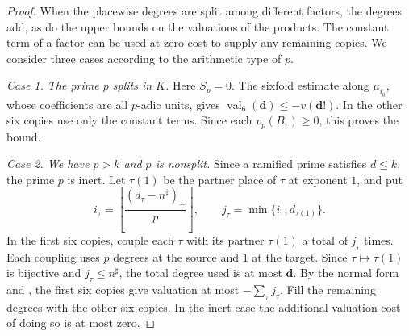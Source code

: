\begin{proof}
When the placewise degrees are split among different factors, the degrees add, as do the upper bounds on the valuations of the products. The constant term of a factor can be used at zero cost to supply any remaining copies. We consider three cases according to the arithmetic type of $p$.

\emph{Case 1. The prime $p$ splits in $K$.} Here $S_p=0$. The sixfold estimate along $\mu_{i_0}$, whose coefficients are all $p$-adic units, gives $\operatorname{val}_6(\boldsymbol d)\le-v(\boldsymbol d!)$. In the other six copies use only the constant terms. Since each $v_p(B_\tau)\ge0$, this proves the bound.

\emph{Case 2. We have $p>k$ and $p$ is nonsplit.} Since a ramified prime satisfies $d\le k$, the prime $p$ is inert. Let $\tau(1)$ be the partner place of $\tau$ at exponent $1$, and put
\[
 i_\tau=\left\lfloor\frac{(d_\tau-n^\sharp)_+}{p}\right\rfloor,
 \qquad j_\tau=\min\{i_\tau,d_{\tau(1)}\}.
\]
In the first six copies, couple each $\tau$ with its partner $\tau(1)$ a total of $j_\tau$ times. Each coupling uses $p$ degrees at the source and $1$ at the target. Since $\tau\mapsto\tau(1)$ is bijective and $j_\tau\le n^\sharp$, the total degree used is at most $\boldsymbol d$. By the normal form and , the first six copies give valuation at most $-\sum_\tau j_\tau$. Fill the remaining degrees with the other six copies. In the inert case the additional valuation cost of doing so is at most zero.


\end{proof}
